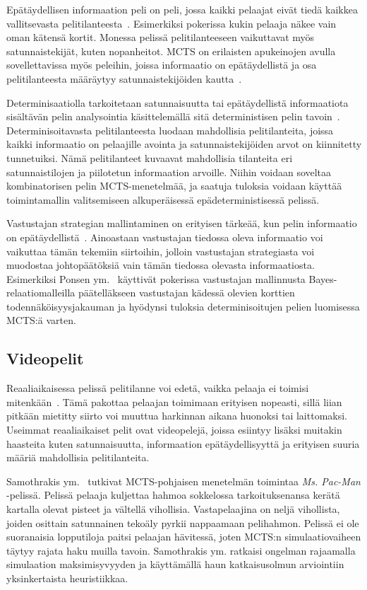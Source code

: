 \documentclass[12pt,finnish]{tktltiki2}
\theoremstyle{definition}
\theoremstyle{remark}
\begin{document}
Epätäydellisen informaation peli on peli, jossa kaikki pelaajat eivät tiedä kaikkea vallitsevasta pelitilanteesta~\cite{browne}. Esimerkiksi pokerissa kukin pelaaja näkee vain oman kätensä kortit. Monessa pelissä pelitilanteeseen vaikuttavat myös satunnaistekijät, kuten nopanheitot. MCTS on erilaisten apukeinojen avulla sovellettavissa myös peleihin, joissa informaatio on epätäydellistä ja osa pelitilanteesta määräytyy satunnaistekijöiden kautta~\cite{browne}.

Determinisaatiolla tarkoitetaan satunnaisuutta tai epätäydellistä informaatiota sisältävän pelin analysointia käsittelemällä sitä deterministisen pelin tavoin~\cite{browne}. Determinisoitavasta pelitilanteesta luodaan mahdollisia pelitilanteita, joissa kaikki informaatio on pelaajille avointa ja satunnaistekijöiden arvot on kiinnitetty tunnetuiksi. Nämä pelitilanteet kuvaavat mahdollisia tilanteita eri satunnaistilojen ja piilotetun informaation arvoille. Niihin voidaan soveltaa kombinatorisen pelin MCTS-menetelmää, ja saatuja tuloksia voidaan käyttää toimintamallin valitsemiseen alkuperäisessä epädeterministisessä pelissä.

Vastustajan strategian mallintaminen on erityisen tärkeää, kun pelin informaatio on epätäydellistä~\cite{browne}. Ainoastaan vastustajan tiedossa oleva informaatio voi vaikuttaa tämän tekemiin siirtoihin, jolloin vastustajan strategiasta voi muodostaa johtopäätöksiä vain tämän tiedossa olevasta informaatiosta. Esimerkiksi Ponsen ym.~\cite{ponsen} käyttivät pokerissa vastustajan mallinnusta Bayes-relaatiomalleilla päätelläkseen vastustajan kädessä olevien korttien todennäköisyysjakauman ja hyödynsi tuloksia determinisoitujen pelien luomisessa MCTS:ä varten.

\subsection{Videopelit}

Reaaliaikaisessa pelissä pelitilanne voi edetä, vaikka pelaaja ei toimisi mitenkään~\cite{browne}. Tämä pakottaa pelaajan toimimaan erityisen nopeasti, sillä liian pitkään mietitty siirto voi muuttua harkinnan aikana huonoksi tai laittomaksi. Useimmat reaaliaikaiset pelit ovat videopelejä, joissa esiintyy lisäksi muitakin haasteita kuten satunnaisuutta, informaation epätäydellisyyttä ja erityisen suuria määriä mahdollisia pelitilanteita.

Samothrakis ym.~\cite{samothrakis} tutkivat MCTS-pohjaisen menetelmän toimintaa \textit{Ms. Pac-Man} -pelissä. Pelissä pelaaja kuljettaa hahmoa sokkelossa tarkoituksenansa kerätä kartalla olevat pisteet ja vältellä vihollisia. Vastapelaajina on neljä vihollista, joiden osittain satunnainen tekoäly pyrkii nappaamaan pelihahmon. Pelissä ei ole suoranaisia lopputiloja paitsi pelaajan hävitessä, joten MCTS:n simulaatiovaiheen täytyy rajata haku muilla tavoin. Samothrakis ym. ratkaisi ongelman rajaamalla simulaation maksimisyvyyden ja käyttämällä haun katkaisusolmun arviointiin yksinkertaista heuristiikkaa.
\end{document}
